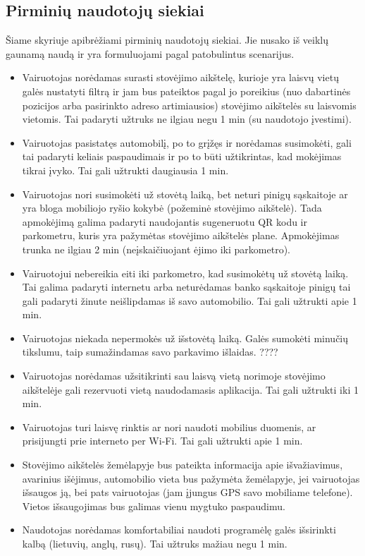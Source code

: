 \documentclass{VUMIFPSkursinis}
\begin{document}
\subsection{Pirminių naudotojų siekiai}
Šiame skyriuje apibrėžiami pirminių naudotojų siekiai. Jie nusako iš veiklų gaunamą naudą  ir yra formuluojami pagal patobulintus scenarijus.
\begin{itemize}
	\item Vairuotojas norėdamas surasti stovėjimo aikštelę, kurioje yra laisvų vietų galės nustatyti filtrą ir jam bus pateiktos pagal jo poreikius (nuo dabartinės pozicijos arba pasirinkto adreso artimiausios) stovėjimo aikštelės su laisvomis vietomis. Tai padaryti užtruks ne ilgiau negu 1 min (su naudotojo įvestimi).
	\item Vairuotojas pasistatęs automobilį, po to grįžęs ir norėdamas susimokėti, gali tai padaryti keliais paspaudimais ir po to būti užtikrintas, kad mokėjimas tikrai įvyko. Tai gali užtrukti daugiausia 1 min.
	\item Vairuotojas nori susimokėti už stovėtą laiką, bet neturi pinigų sąskaitoje ar yra bloga mobiliojo ryšio kokybė (požeminė stovėjimo aikštelė). Tada apmokėjimą galima padaryti naudojantis sugeneruotu QR kodu ir parkometru, kuris yra pažymėtas stovėjimo aikštelės plane. Apmokėjimas trunka ne ilgiau 2 min (neįskaičiuojant ėjimo iki parkometro).
	\item Vairuotojui nebereikia eiti iki parkometro, kad susimokėtų už stovėtą laiką. Tai galima padaryti internetu arba neturėdamas banko sąskaitoje pinigų tai gali padaryti žinute neišlipdamas iš savo automobilio. Tai gali užtrukti apie 1 min.
	\item Vairuotojas niekada nepermokės už išstovėtą laiką. Galės sumokėti minučių tikslumu, taip sumažindamas savo parkavimo išlaidas. ????
	\item Vairuotojas norėdamas užsitikrinti sau laisvą vietą norimoje stovėjimo aikštelėje gali rezervuoti vietą naudodamasis aplikacija. Tai gali užtrukti iki 1 min.
	\item Vairuotojas turi laisvę rinktis ar nori naudoti mobilius duomenis, ar prisijungti prie interneto per Wi-Fi. Tai gali užtrukti apie 1 min.
	\item Stovėjimo aikštelės žemėlapyje bus pateikta informacija apie išvažiavimus, avarinius išėjimus, automobilio vieta bus pažymėta žemėlapyje, jei vairuotojas išsaugos ją, bei pats vairuotojas (jam įjungus GPS savo mobiliame telefone). Vietos išsaugojimas bus galimas vienu mygtuko paspaudimu.
	\item Naudotojas norėdamas komfortabiliai naudoti programėlę galės išsirinkti kalbą (lietuvių, anglų, rusų). Tai užtruks mažiau negu 1 min.

\end{itemize}
\end{document}
